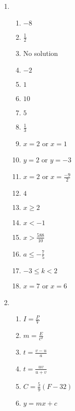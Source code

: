 {\begin{multicols}{3}
 
\begin{enumerate}[noitemsep, label=\textbf{\arabic*}. ] 
 \item %
\begin{enumerate}[noitemsep,label=\textbf{(\alph*)}]
\item $-8$%
\item $\frac{1}{2}$%
\item No solution%
\item $-2$%
\item $1$%
\item $10$%
\item $5$%
\item $\frac{1}{3}$%
\item $x = 2$ or $ x = 1$%
\item $y = 2$ or $y = -3$%
\item $x =2$ or $x = \frac{-9}{2}$%
\item $4$%
\item $x\geq 2$%
\item $x<-1$%
\item $x>\frac{588}{10}$%
\item $a\leq -\frac{7}{5}$%
\item $-3\leq k<2$%
\item $x = 7$ or $x = 6$%

\end{enumerate}

\item %
\begin{enumerate}[itemsep=1pt,label=\textbf{(\alph*)}]
\item $I=\frac{P}{V}$
\item $m=\frac{E}{c^2}$
\item $t=\frac{v-u}{a}$
\item $t=\frac{uv}{u+v}$
\item $C=\frac{5}{9}(F-32)$
\item $y=mx+c$
\end{enumerate}


\end{enumerate}
\end{multicols}}
